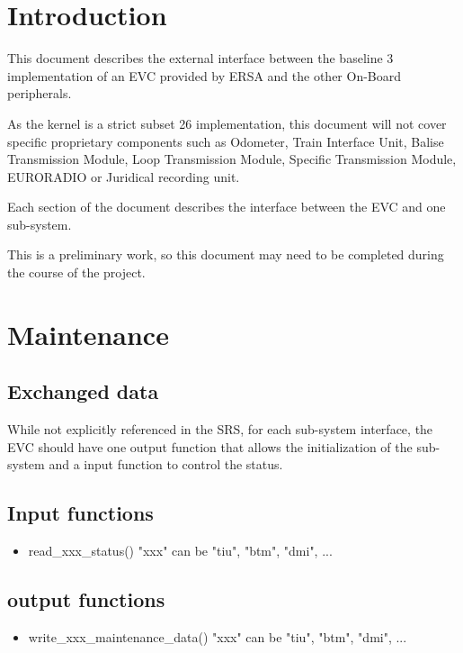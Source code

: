 \documentclass{template/openetcs_article}
\begin{document}


\section{Introduction}

This document describes the external interface between the baseline 3 implementation of an EVC provided by ERSA and the other On-Board peripherals.

As the kernel is a strict subset 26 implementation, this document will not cover specific proprietary components such as Odometer, Train Interface Unit, Balise Transmission Module, Loop Transmission Module, Specific Transmission Module, EURORADIO or Juridical recording unit.

Each section of the document describes the interface between the EVC and one sub-system.

This is a preliminary work, so this document may need to be completed during the course of the project. 

\section{Maintenance}
	\subsection{Exchanged data}
		While not explicitly referenced in the SRS, for each sub-system interface, the EVC should have one output function that allows the initialization of the sub-system and a input function to control the status.
	\subsection{Input functions}
		\begin{itemize}
			\item read\_xxx\_status()
				\subitem "xxx" can be "tiu", "btm", "dmi", ...
		\end{itemize}
	\subsection{output functions}
		\begin{itemize}
			\item write\_xxx\_maintenance\_data()
				\subitem "xxx" can be "tiu", "btm", "dmi", ...
		\end{itemize}
\end{document}

